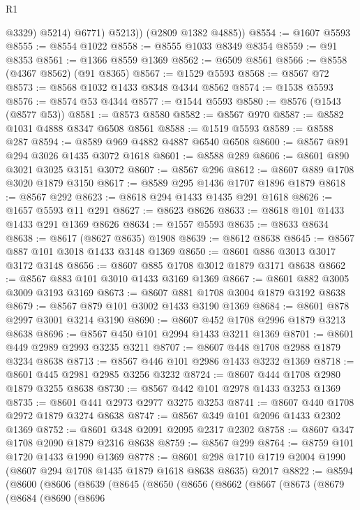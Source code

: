 \begin{lexlean}{R1}
\begin{coremodule}
                @3329)
              @5214)
            @6771)
          @5213))
      (@2809 @1382 @4885))
@8554 := @1607 @5593
@8555 := @8554 @1022
@8558 := @8555 @1033 @8349 @8354
@8559 := @91 @8353
@8561 := @1366 @8559 @1369
@8562 := @6509 @8561
@8566 := @8558 (@4367 @8562) (@91 @8365)
@8567 := @1529 @5593
@8568 := @8567 @72
@8573 := @8568 @1032 @1433 @8348 @4344 @8562
@8574 := @1538 @5593
@8576 := @8574 @53 @4344
@8577 := @1544 @5593
@8580 := @8576 (@1543 (@8577 @53))
@8581 := @8573 @8580
@8582 := @8567 @970
@8587 := @8582 @1031 @4888 @8347 @6508 @8561
@8588 := @1519 @5593
@8589 := @8588 @287
@8594 := @8589 @969 @4882 @4887 @6540 @6508
@8600 := @8567 @891 @294 @3026 @1435 @3072 @1618
@8601 := @8588 @289
@8606 := @8601 @890 @3021 @3025 @3151 @3072
@8607 := @8567 @296
@8612 := @8607 @889 @1708 @3020 @1879 @3150
@8617 := @8589 @295 @1436 @1707 @1896 @1879
@8618 := @8567 @292
@8623 := @8618 @294 @1433 @1435 @291 @1618
@8626 := @1657 @5593 @11 @291
@8627 := @8623 @8626
@8633 := @8618 @101 @1433 @1433 @291 @1369 @8626
@8634 := @1557 @5593
@8635 := @8633 @8634
@8638 := @8617 (@8627 @8635) @1908
@8639 := @8612 @8638
@8645 := @8567 @887 @101 @3018 @1433 @3148 @1369
@8650 := @8601 @886 @3013 @3017 @3172 @3148
@8656 := @8607 @885 @1708 @3012 @1879 @3171 @8638
@8662 := @8567 @883 @101 @3010 @1433 @3169 @1369
@8667 := @8601 @882 @3005 @3009 @3193 @3169
@8673 := @8607 @881 @1708 @3004 @1879 @3192 @8638
@8679 := @8567 @879 @101 @3002 @1433 @3190 @1369
@8684 := @8601 @878 @2997 @3001 @3214 @3190
@8690 := @8607 @452 @1708 @2996 @1879 @3213 @8638
@8696 := @8567 @450 @101 @2994 @1433 @3211 @1369
@8701 := @8601 @449 @2989 @2993 @3235 @3211
@8707 := @8607 @448 @1708 @2988 @1879 @3234 @8638
@8713 := @8567 @446 @101 @2986 @1433 @3232 @1369
@8718 := @8601 @445 @2981 @2985 @3256 @3232
@8724 := @8607 @444 @1708 @2980 @1879 @3255 @8638
@8730 := @8567 @442 @101 @2978 @1433 @3253 @1369
@8735 := @8601 @441 @2973 @2977 @3275 @3253
@8741 := @8607 @440 @1708 @2972 @1879 @3274 @8638
@8747 := @8567 @349 @101 @2096 @1433 @2302 @1369
@8752 := @8601 @348 @2091 @2095 @2317 @2302
@8758 := @8607 @347 @1708 @2090 @1879 @2316 @8638
@8759 := @8567 @299
@8764 := @8759 @101 @1720 @1433 @1990 @1369
@8778 := @8601 @298 @1710 @1719 @2004 @1990 (@8607 @294 @1708 @1435 @1879 @1618 @8638 @8635) @2017
@8822 := @8594
    (@8600
      (@8606
        (@8639
          (@8645
            (@8650
              (@8656
                (@8662
                  (@8667
                    (@8673
                      (@8679
                        (@8684
                          (@8690
                            (@8696

\end{coremodule}
\end{lexlean}
